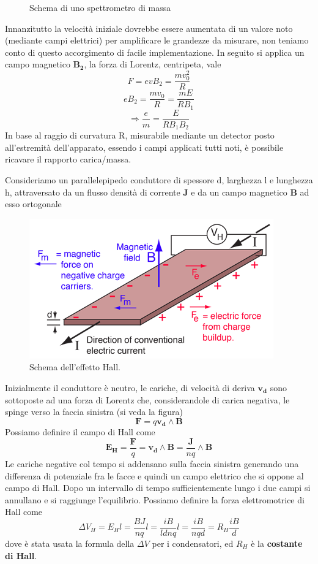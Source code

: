 \documentclass[
10pt, %
a4paper, %
oneside, %
headinclude,footinclude, %
BCOR5mm, %
]{scrartcl}
\begin{document}
\begin{applicazione}
\begin{figure}[h!]
	\caption{Schema di uno spettrometro di massa}
	\label{fig:spettrometro}
\end{figure}
\FloatBarrier
Innanzitutto la velocità iniziale dovrebbe essere aumentata di un valore noto (mediante campi elettrici) per amplificare le grandezze da misurare, non teniamo conto di questo accorgimento di facile implementazione. In seguito si applica un campo magnetico $\mathbf{B_2}$, la forza di Lorentz, centripeta, vale
\[F = evB_2= \frac{mv_0^2}{R}\]
\[eB_2 = \frac{mv_0}{R}= \frac{mE}{RB_1} \]
\[\Rightarrow \frac{e}{m}= \frac{E}{RB_1B_2}\]
In base al raggio di curvatura R, misurabile mediante un detector posto all'estremità dell'apparato, essendo i campi applicati tutti noti, è possibile ricavare il rapporto carica/massa.
\end{applicazione}
\begin{applicazione}
	Consideriamo un parallelepipedo conduttore di spessore d, larghezza l e lunghezza h, attraversato da un flusso densità di corrente $\mathbf{J}$ e da un campo magnetico \(\mathbf{B}\) ad esso ortogonale
\begin{figure}[h!]
	\centering
	\includegraphics[width=0.6\linewidth]{images/hall_effect}
	\caption{Schema dell'effetto Hall.}
	\label{fig:halleffect}
\end{figure}
\FloatBarrier
Inizialmente il conduttore è neutro, le cariche, di velocità di deriva $\mathbf{v_d}$ sono sottoposte ad una forza di Lorentz che, considerandole di carica negativa, le spinge verso la faccia sinistra (si veda la figura)
\[\mathbf{F}= q\mathbf{v_d}\wedge\mathbf{B}\] 
Possiamo definire il campo di Hall come
\[\mathbf{E_H}=\frac{\mathbf{F}}{q}=\mathbf{v_d}\wedge\mathbf{B}=\frac{\mathbf{J}}{nq}\wedge\mathbf{B}\]
Le cariche negative col tempo si addensano sulla faccia sinistra generando una differenza di potenziale fra le facce e quindi un campo elettrico che si oppone al campo di Hall. Dopo un intervallo di tempo sufficientemente lungo i due campi si annullano e si raggiunge l'equilibrio. Possiamo definire la forza elettromotrice di Hall come
\[\Delta V_H = E_H l =\frac{BJ}{nq}l =\frac{iB}{ldnq}l=\frac{i B}{nqd} = R_H \frac{iB}{d}\] 
dove è stata usata la formula della \(\Delta V\) per i condensatori, ed \(R_H\) è la \textbf{costante di Hall}.
\end{applicazione}
\end{document}
